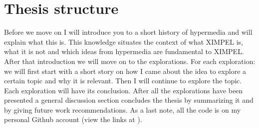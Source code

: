 \section{Thesis structure}
Before we move on I will introduce you to a short history of hypermedia and will explain what this is. This knowledge situates the context of what XIMPEL is, what it is not and which ideas from hypermedia are fundamental to XIMPEL. After that introduction we will move on to the explorations. For each exploration: we will first start with a short story on how I came about the idea to explore a certain topic and why it is relevant. Then I will continue to explore the topic. Each exploration will have its conclusion. After all the explorations have been presented a general discussion section concludes the thesis by summarizing it and by giving future work recommendations. 
As a last note, all the code is on my personal Github account (view the links at \cite{github:ximpel_react, github:ximpel_js, github:ximpel_analytics_server, github:ximpel_terminal_media_type_server}). 




